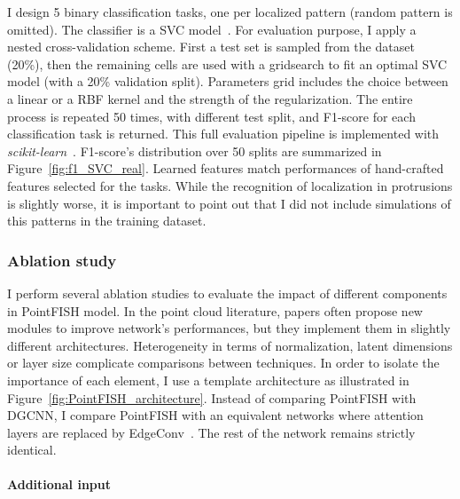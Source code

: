 I design 5 binary classification tasks, one per localized pattern (random pattern is omitted).
The classifier is a SVC model~\cite{chang2011libsvm}.
For evaluation purpose, I apply a nested cross-validation scheme.
First a test set is sampled from the dataset (20\%), then the remaining cells are used with a gridsearch to fit an optimal SVC model (with a 20\% validation split).
Parameters grid includes the choice between a linear or a RBF kernel and the strength of the regularization.
The entire process is repeated 50 times, with different test split, and F1-score for each classification task is returned.
This full evaluation pipeline is implemented with \emph{scikit-learn}~\cite{scikit-learn}.
F1-score's distribution over 50 splits are summarized in Figure~\ref{fig:f1_SVC_real}.
Learned features match performances of hand-crafted features selected for the tasks.
While the recognition of localization in protrusions is slightly worse, it is important to point out that I did not include simulations of this patterns in the training dataset.

\subsubsection{Ablation study}

I perform several ablation studies to evaluate the impact of different components in PointFISH model.
In the point cloud literature, papers often propose new modules to improve network's performances, but they implement them in slightly different architectures.
Heterogeneity in terms of normalization, latent dimensions or layer size complicate comparisons between techniques.
In order to isolate the importance of each element, I use a template architecture as illustrated in Figure~\ref{fig:PointFISH_architecture}.
Instead of comparing PointFISH with DGCNN, I compare PointFISH with an equivalent networks where attention layers are replaced by EdgeConv~\cite{Wang_2019}.
The rest of the network remains strictly identical.

\paragraph{Additional input}

